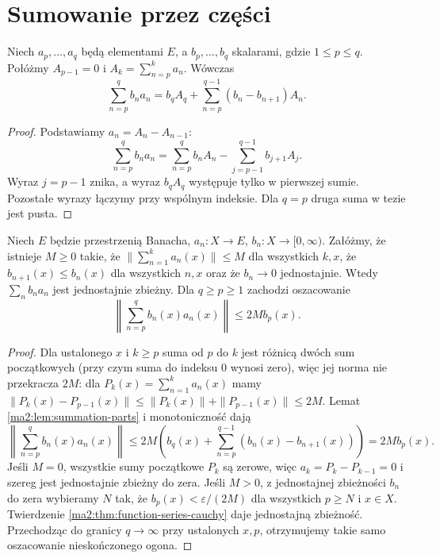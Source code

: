 \section{Sumowanie przez części}

\begin{lemat}
\label{ma2:lem:summation-parts}
Niech $a_p,\ldots,a_q$ będą elementami $E$,
a $b_p,\ldots,b_q$ skalarami, gdzie $1\le p\le q$.
Połóżmy $A_{p-1}=0$ i $A_k=\sum_{n=p}^k a_n$.
Wówczas
\[
 \sum_{n=p}^q b_n a_n
 = b_q A_q+\sum_{n=p}^{q-1}(b_n-b_{n+1})A_n.
\]
\end{lemat}
\begin{proof}
Podstawiamy $a_n=A_n-A_{n-1}$:
\[
 \sum_{n=p}^q b_n a_n
 =\sum_{n=p}^q b_n A_n
   -\sum_{j=p-1}^{q-1}b_{j+1}A_j.
\]
Wyraz $j=p-1$ znika, a wyraz $b_qA_q$
występuje tylko w pierwszej sumie. Pozostałe
wyrazy łączymy przy wspólnym indeksie.
Dla $q=p$ druga suma w tezie jest pusta.
\end{proof}

\begin{twierdzenie}
\label{ma2:thm:uniform-dirichlet}
Niech $E$ będzie przestrzenią Banacha,
$a_n:X\to E$, $b_n:X\to[0,\infty)$.
Załóżmy, że istnieje $M\ge0$ takie, że
$\|\sum_{n=1}^k a_n(x)\|\le M$ dla wszystkich $k,x$,
że $b_{n+1}(x)\le b_n(x)$ dla wszystkich $n,x$
oraz że $b_n\to0$ jednostajnie.
Wtedy $\sum_n b_n a_n$ jest jednostajnie zbieżny.
Dla $q\ge p\ge1$ zachodzi oszacowanie
\[
 \left\|\sum_{n=p}^q b_n(x)a_n(x)\right\|
 \le 2M b_p(x).
\]
\end{twierdzenie}
\begin{proof}
Dla ustalonego $x$ i $k\ge p$ suma od $p$ do $k$
jest różnicą dwóch sum początkowych (przy czym
suma do indeksu $0$ wynosi zero), więc jej norma
nie przekracza $2M$: dla $P_k(x)=\sum_{n=1}^k a_n(x)$
mamy $\|P_k(x)-P_{p-1}(x)\|\le
\|P_k(x)\|+\|P_{p-1}(x)\|\le2M$.
Lemat \ref{ma2:lem:summation-parts} i monotoniczność
dają
\[
 \left\|\sum_{n=p}^q b_n(x)a_n(x)\right\|
 \le 2M\left(b_q(x)+
              \sum_{n=p}^{q-1}(b_n(x)-b_{n+1}(x))\right)
 =2M b_p(x).
\]
Jeśli $M=0$, wszystkie sumy początkowe
$P_k$ są zerowe, więc $a_k=P_k-P_{k-1}=0$
i szereg jest jednostajnie zbieżny do zera.
Jeśli $M>0$, z jednostajnej zbieżności $b_n$ do zera
wybieramy $N$ tak, że $b_p(x)<\varepsilon/(2M)$
dla wszystkich $p\ge N$ i $x\in X$.
Twierdzenie \ref{ma2:thm:function-series-cauchy}
daje jednostajną zbieżność. Przechodząc do granicy
$q\to\infty$ przy ustalonych $x,p$, otrzymujemy
takie samo oszacowanie nieskończonego ogona.
\end{proof}


